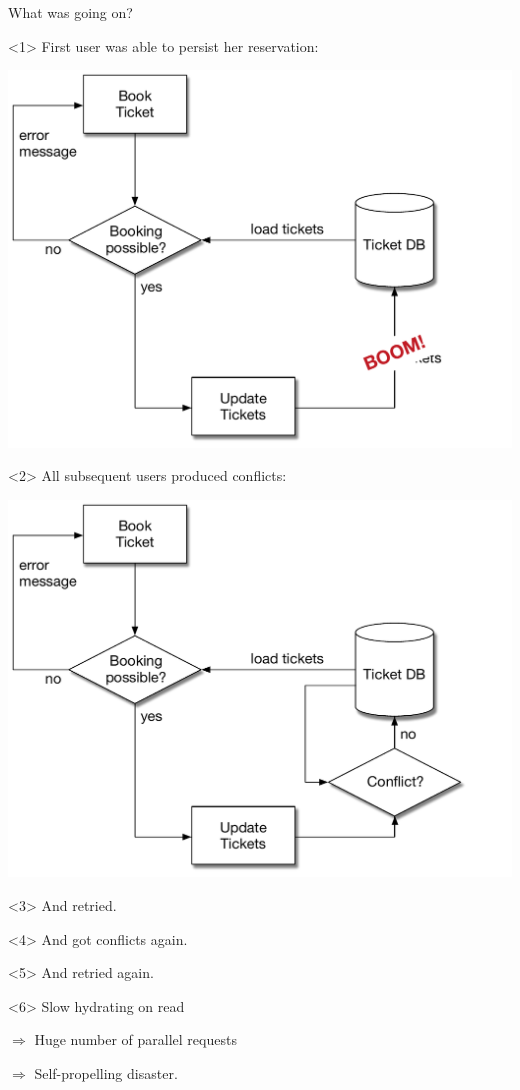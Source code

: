 \begin{frame}[fragile]{What was going on?}

\renewcommand{\SPACE}{3em}

\begin{center}

\begin{onlyenv}<1>
First user was able to persist her reservation:

\includegraphics[width=.4\textwidth]{../OptimisticLocking5.pdf}
\end{onlyenv}

\begin{onlyenv}<2>
All subsequent users produced conflicts: 

\includegraphics[width=.4\textwidth]{../OptimisticLocking6.pdf}
\end{onlyenv}

\begin{onlyenv}<3>
\Large
And retried.
\end{onlyenv}

\begin{onlyenv}<4>
\LARGE
And got conflicts again.
\end{onlyenv}

\begin{onlyenv}<5>
\Huge
And retried again.
\end{onlyenv}

\begin{onlyenv}<6>
Slow hydrating on read
\vspace{\SPACE}

$\Longrightarrow$ Huge number of parallel requests
\vspace{\SPACE}

$\Longrightarrow$ Self-propelling disaster.
\end{onlyenv}

\end{center}

\end{frame}

